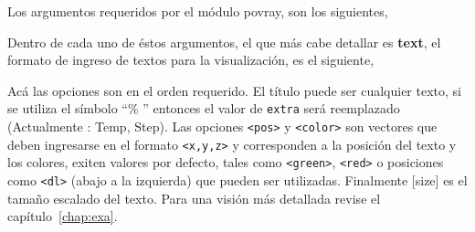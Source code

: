 Los argumentos requeridos por el m\'odulo povray, son los siguientes,


Dentro de cada uno de \'estos argumentos, el que m\'as cabe detallar es \textbf{text}, el formato de ingreso de textos para la visualizaci\'on, es el siguiente,


Ac\'a las opciones son en el orden requerido. El t\'itulo puede ser cualquier texto, si se utiliza el s\'imbolo ``\% '' entonces el valor de \verb|extra| ser\'a reemplazado (Actualmente : Temp, Step). Las opciones \verb|<pos>| y \verb|<color>| son vectores que deben ingresarse en el formato \verb|<x,y,z>| y corresponden a la posici\'on del texto y los colores, exiten valores por defecto, tales como \verb|<green>|, \verb|<red>| o posiciones como \verb|<dl>| (abajo a la izquierda) que pueden ser utilizadas. Finalmente [size] es el tama\~no escalado del texto. Para una visi\'on m\'as detallada revise el cap\'itulo~\ref{chap:exa}.

% 
% 


